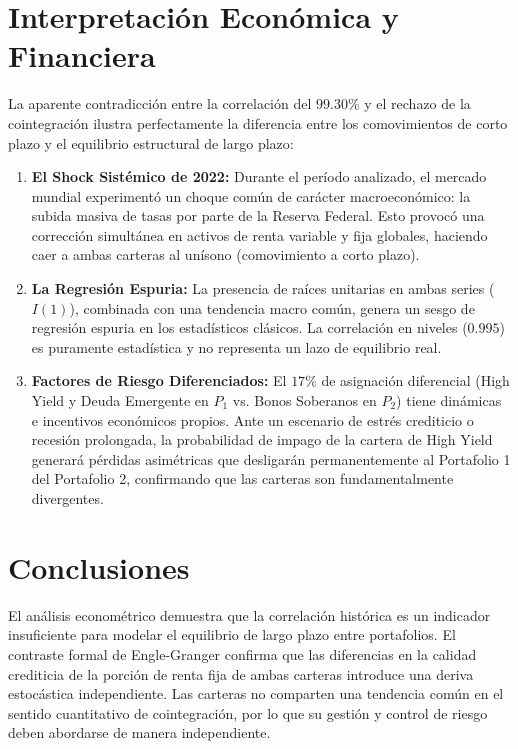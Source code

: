 \documentclass[11pt,a4paper]{article}
\begin{document}
\section{Interpretación Económica y Financiera}
La aparente contradicción entre la correlación del $99.30\%$ y el rechazo de la cointegración ilustra perfectamente la diferencia entre los comovimientos de corto plazo y el equilibrio estructural de largo plazo:

\begin{enumerate}
    \item \textbf{El Shock Sistémico de 2022:}
    Durante el período analizado, el mercado mundial experimentó un choque común de carácter macroeconómico: la subida masiva de tasas por parte de la Reserva Federal. Esto provocó una corrección simultánea en activos de renta variable y fija globales, haciendo caer a ambas carteras al unísono (comovimiento a corto plazo).
    \item \textbf{La Regresión Espuria:}
    La presencia de raíces unitarias en ambas series ($I(1)$), combinada con una tendencia macro común, genera un sesgo de regresión espuria en los estadísticos clásicos. La correlación en niveles ($0.995$) es puramente estadística y no representa un lazo de equilibrio real.
    \item \textbf{Factores de Riesgo Diferenciados:}
    El $17\%$ de asignación diferencial (High Yield y Deuda Emergente en $P_1$ vs. Bonos Soberanos en $P_2$) tiene dinámicas e incentivos económicos propios. Ante un escenario de estrés crediticio o recesión prolongada, la probabilidad de impago de la cartera de High Yield generará pérdidas asimétricas que desligarán permanentemente al Portafolio 1 del Portafolio 2, confirmando que las carteras son fundamentalmente divergentes.
\end{enumerate}

\section{Conclusiones}
El análisis econométrico demuestra que la correlación histórica es un indicador insuficiente para modelar el equilibrio de largo plazo entre portafolios. El contraste formal de Engle-Granger confirma que las diferencias en la calidad crediticia de la porción de renta fija de ambas carteras introduce una deriva estocástica independiente. Las carteras no comparten una tendencia común en el sentido cuantitativo de cointegración, por lo que su gestión y control de riesgo deben abordarse de manera independiente.
\end{document}
